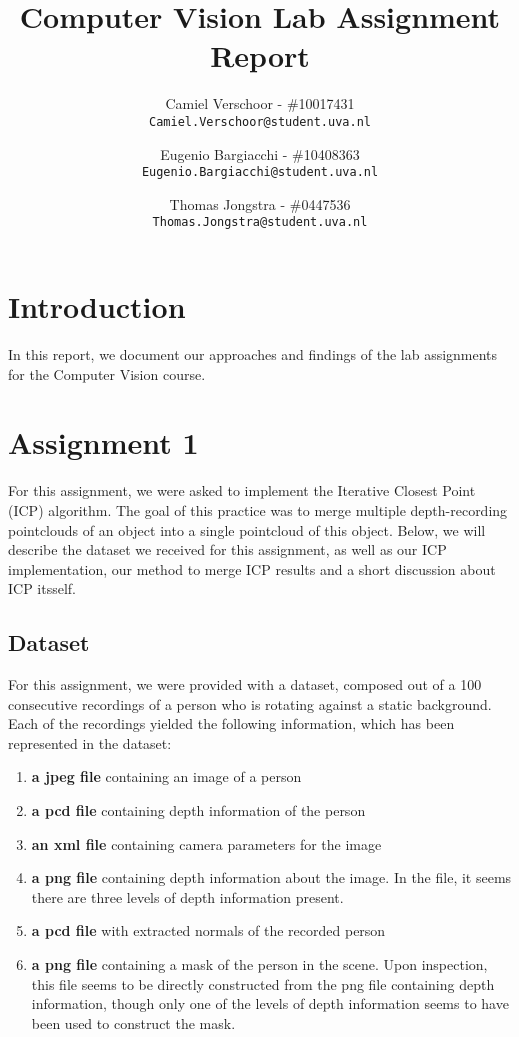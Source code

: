 \documentclass[11pt,english]{article}
\author{
  Camiel Verschoor - \#10017431\\
  \texttt{Camiel.Verschoor@student.uva.nl}
  \and
  Eugenio Bargiacchi - \#10408363\\
  \texttt{Eugenio.Bargiacchi@student.uva.nl}
  \and
  Thomas Jongstra - \#0447536\\
  \texttt{Thomas.Jongstra@student.uva.nl}
}
\title{Computer Vision Lab Assignment Report}
\begin{document}
\maketitle
\newpage
\section*{Introduction}
In this report, we document our approaches and findings of the lab assignments for the Computer Vision course.

\section{Assignment 1}

For this assignment, we were asked to implement the Iterative Closest Point (ICP) algorithm. The goal of this practice was to merge multiple depth-recording pointclouds of an object into a single pointcloud of this object. Below, we will describe the dataset we received for this assignment, as well as our ICP implementation, our method to merge ICP results and a short discussion about ICP itsself.

\subsection*{Dataset}
For this assignment, we were provided with a dataset, composed out of a 100 consecutive recordings of a person who is rotating against a static background. Each of the recordings yielded the following information, which has been represented in the dataset:

\begin{enumerate}
\item \textbf{a jpeg file} containing an image of a person
\item \textbf{a pcd file} containing depth information of the person
\item \textbf{an xml file} containing camera parameters for the image
\item \textbf{a png file} containing depth information about the image. In the file, it seems there are three levels of depth information present.
\item \textbf{a pcd file} with extracted normals of the recorded person
\item \textbf{a png file} containing a mask of the person in the scene. Upon inspection, this file seems to be directly constructed from the png file containing depth information, though only one of the levels of depth information seems to have been used to construct the mask.
\end{enumerate}
\end{document}

